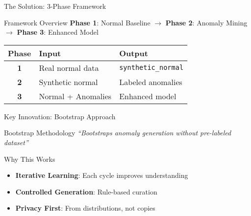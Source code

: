 \documentclass[aspectratio=169,xcolor={dvipsnames}]{beamer}
\newcommand{\code}[1]{\texttt{\small #1}}
\newcommand{\phase}[1]{\textcolor{AccentBlue}{\textbf{Phase #1}}}
\begin{document}
\begin{frame}{The Solution: 3-Phase Framework}
  \begin{block}{Framework Overview}
    \centering
    \phase{1}: Normal Baseline $\rightarrow$ \phase{2}: Anomaly Mining $\rightarrow$ \phase{3}: Enhanced Model
  \end{block}
  
  \vspace{1em}
  \begin{table}[h]
    \centering
    \begin{tabular}{cll}
      \toprule
      \textbf{Phase} & \textbf{Input} & \textbf{Output} \\
      \midrule
      \textbf{1} & Real normal data & \code{synthetic\_normal} \\
      \textbf{2} & Synthetic normal & Labeled anomalies \\
      \textbf{3} & Normal + Anomalies & Enhanced model \\
      \bottomrule
    \end{tabular}
  \end{table}
\end{frame}

\begin{frame}{Key Innovation: Bootstrap Approach}
  \begin{alertblock}{Bootstrap Methodology}
    \centering
    \large\textit{``Bootstraps anomaly generation without pre-labeled dataset''}
  \end{alertblock}
  
  \vspace{1em}
  \begin{block}{Why This Works}
    \begin{itemize}
      \item \textbf{Iterative Learning}: Each cycle improves understanding
      \item \textbf{Controlled Generation}: Rule-based curation
      \item \textbf{Privacy First}: From distributions, not copies
    \end{itemize}
  \end{block}
\end{frame}
\end{document}
